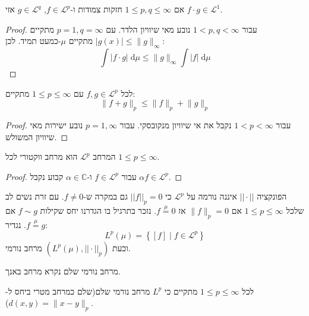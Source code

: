 \documentclass{tstextbook}
\begin{document}
\begin{proposition}
אם \(1\leq p,q\leq \infty\) חזקות צמודות ו-\(f \in \mathcal{L}^{p}\), \(g \in \mathcal{L}^{q}\) אזי \(f\cdot g \in \mathcal{L}^{1}\).

\end{proposition}
\begin{proof}
עבור \(1<p,q<\infty\) נובע מאי שיוויון הלדר. עם \(p=1,q=\infty\) מתקיים \(\lvert g(x) \rvert \leq \lVert g \rVert _{\infty}\) מתקיים \(\mu\)-כמעט תמיד. לכן:
$$\int \left\lvert  f\cdot g  \right\rvert  \;\mathrm{d} \mu \leq \lVert g \rVert _{\infty}\int \lvert f \rvert  \;\mathrm{d} \mu  $$

\end{proof}
\begin{proposition}
לכל \(f,g \in \mathcal{L}^{p}\) עם \(1\leq p\leq \infty\) מתקיים:
$$\lVert f+g \rVert_{p} \leq \lVert f \rVert _{p} + \lVert g \rVert _{p}$$

\end{proposition}
\begin{proof}
עבור \(1<p< \infty\) נקבל את אי שיוויון מנקובסקי.
עבור \(p=1,\infty\) נובע ישירות מאי שיוויון המשולש.

\end{proof}
\begin{corollary}
המרחב \(\mathcal{L}^{p}\) הוא מרחב ווקטורי לכל \(1\leq p\leq \infty\).

\end{corollary}
\begin{proof}
עבור \(f \in \mathcal{L}^{p}\) ו-\(\alpha \in \mathbb{C}\) קבוע נקבל \(\alpha f \in \mathcal{L}^{p}\).

\end{proof}
\begin{remark}
הפונקציה \(||\cdot||\) איננה נורמה על \(\mathcal{L}^{p}\) כי \(||f||_{p}=0\) גם במקרה ש-\(f\neq 0\). עם זרת נשים לב שלכל \(1\leq p\leq \infty\) אם \(\lVert f \rVert_{p}=0\) אז \(f \overset{\mu}{=} 0\). 
נזכר בתרגיל בו הגדרנו יחס שקילות \(f \sim g\) אם \(f\overset{\mu}{=} g\). נגדיר:
$$L^{p}\left( \mu \right)=\left\{  [f]\mid f \in \mathcal{L} ^{p}  \right\}$$
וכעת \(\left( L^{p}\left( \mu \right),||\cdot||_{p} \right)\) מרחב נורמי.

\end{remark}
\begin{definition}
מרחב נורמי שלם נקרא מרחב באנך.

\end{definition}
\begin{proposition}
לכל \(1\leq p\leq \infty\) מתקיים כי \(L^{p}\) מרחב נורמי שלם(שלם כמרחב מטרי ביחס ל-\(d(x,y)=\lVert x-y \rVert_{p}\)).

\end{proposition}
\end{document}
